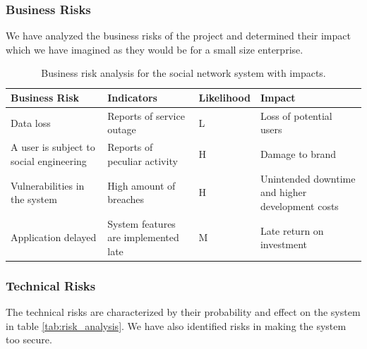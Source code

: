 \documentclass[a4paper]{article}
\begin{document}
\subsubsection{Business Risks}
We have analyzed the business risks of the project and determined their impact which we have imagined as they would be for a small size enterprise.
\begin{table}[h!]
\begin{tabular}{| p{4cm} | p{3cm} | l | p{3cm} |}
\hline
\textbf{Business Risk} & \textbf{Indicators} & \textbf{Likelihood} & \textbf{Impact} \\ \hline
Data loss & Reports of service outage & L & Loss of potential users\\\hline
A user is subject to social engineering & Reports of peculiar activity & H & Damage to brand \\\hline
Vulnerabilities in the system & High amount of breaches & H & Unintended downtime and higher development costs \\\hline
Application delayed & System features are implemented late & M & Late return on investment \\\hline
\end{tabular}
	\caption{Business risk analysis for the social network system with impacts.}
		\label{tab:business_risk_analysis}
\end{table}

\subsubsection{Technical Risks}
The technical risks are characterized by their probability and effect on the system in table \ref{tab:risk_analysis}. We have also identified risks in making the system too secure.
\end{document}
